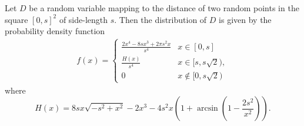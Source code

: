 \begin{theorem} \label{theorem:distance_square}
  Let $D$ be a random variable mapping to the distance of
  two random points in the square $[0,s]^2$ of side-length $s$. Then the
  distribution of $D$ is given by the probability density function
  \vspace{0.25cm}
  \begin{align}\label{eq:distance_square}
    f(x) = \begin{cases} \frac{2 x^4 - 8 s x^3 + 2 \pi s^2 x}{s^4} & x \in
      [0,s]\\ \frac{H(x)}{s^4} & x \in [s,s\sqrt{2}),\\0 & x \notin [0,s\sqrt{2})
               \end{cases}
  \end{align}
  where
  \[
    H(x)=8 s x \sqrt{-s^2+x^2} - 2x^3  
          - 4 s^2 x \left(1+\arcsin\left(1-\frac{2 s^2}{x^2}\right)\right).
  \]
\end{theorem}
%

